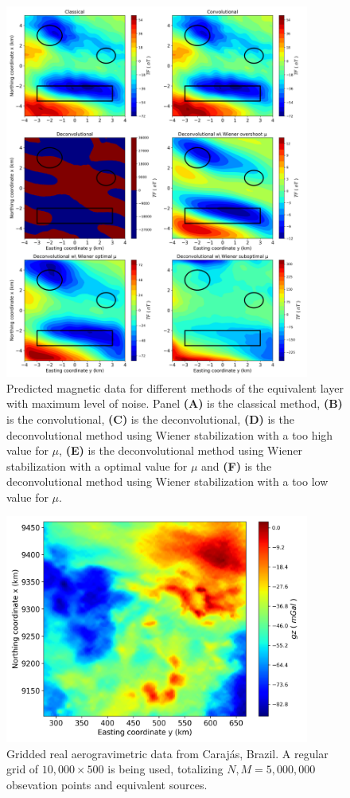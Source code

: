\begin{figure}[htbp]
	\begin{center}
		\includegraphics[width=10cm]{Fig/stability_mag_comparison}
	\end{center}
	\caption{Predicted magnetic data for different methods of the equivalent layer with maximum level of noise. Panel \textbf{(A)} is the classical method, \textbf{(B)} is the convolutional, \textbf{(C)} is the deconvolutional, \textbf{(D)} is the deconvolutional method using Wiener stabilization with a too high value for $\mu$, \textbf{(E)} is the deconvolutional method using Wiener stabilization with a optimal value for $\mu$ and \textbf{(F)} is the deconvolutional method using Wiener stabilization with a too low value for $\mu$.}
	\label{fig:8}
\end{figure}

\begin{figure}[htbp]
	\begin{center}
		\includegraphics[width=10cm]{Fig/carajas_gz_real_data_1000x500}
	\end{center}
	\caption{Gridded real aerogravimetric data from Carajás, Brazil. A regular grid of $10,000 \times 500$ is being used, totalizing $N,M = 5, 000, 000$ obsevation points and equivalent sources.}
	\label{fig:9}
\end{figure}

